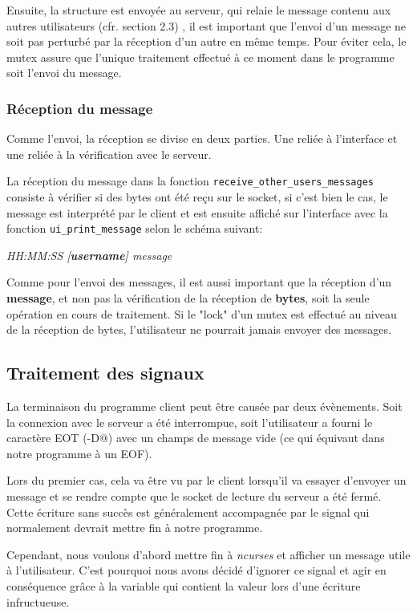 Ensuite, la structure est envoyée au serveur, qui relaie le message contenu
aux autres utilisateurs (cfr. section 2.3) , il est important que
l'envoi d'un message ne soit pas perturbé par la réception d'un autre en même temps.
Pour éviter cela, le mutex assure que l'unique traitement effectué à ce moment
dans le programme soit l'envoi du message.

\subsubsection{Réception du message}
Comme l'envoi, la réception se divise en deux parties. Une reliée à
l'interface et une reliée à la vérification avec le serveur.

La réception du message dans la fonction \texttt{receive\_other\_users\_messages}
consiste à vérifier si des bytes ont été reçu sur le socket,
si c'est bien le cas, le message est interprété par le client et est ensuite
affiché sur l'interface avec la fonction \texttt{ui\_print\_message} selon le schéma suivant: \\
\begin{center}
    \textit{HH:MM:SS [\textbf{username}] message}
\end{center}
Comme pour l'envoi des messages, il est aussi important que
la réception d'un \textbf{message}, et non pas la vérification de la réception de \textbf{bytes},
soit la seule opération en cours de traitement. Si le "lock" d'un mutex
est effectué au niveau de la réception de bytes, l'utilisateur ne pourrait jamais
envoyer des messages.

\subsection{Traitement des signaux}

La terminaison du programme client peut être causée par deux
évènements. Soit la connexion avec le serveur a été
interrompue, soit l'utilisateur a fourni le caractère EOT
(\verb@Ctrl-D@) avec un champs de message vide
(ce qui équivaut dans notre programme à un EOF).

Lors du premier cas, cela va être vu par le client
lorsqu'il va essayer d'envoyer un message
et se rendre compte que le socket de lecture du serveur a
été fermé. Cette écriture sans succès est généralement
accompagnée par le signal \verb@SIGPIPE@ qui normalement
devrait mettre fin à notre programme.

Cependant, nous
voulons d'abord mettre fin à \emph{ncurses} et afficher un
message utile à l'utilisateur. C'est pourquoi nous avons
décidé d'ignorer ce signal et agir en conséquence grâce à la
variable \verb@errno@ qui contient la valeur \verb@EPIPE@
lors d'une écriture infructueuse.


